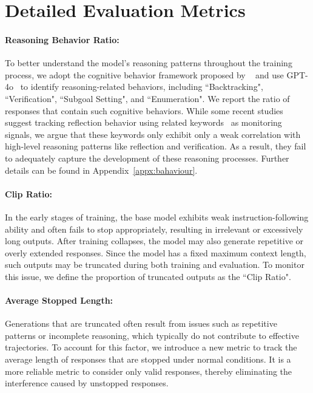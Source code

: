 \section{Detailed Evaluation Metrics}
\label{appx:eval_detail}
\paragraph{Reasoning Behavior Ratio:} To better understand the model's reasoning patterns throughout the training process, we adopt the cognitive behavior framework proposed by ~\citet{gandhi2025cognitive} and use GPT-4o~\citep{hurst2024gpt} to identify reasoning-related behaviors, including ``Backtracking", ``Verification", ``Subgoal Setting", and ``Enumeration". 
We report the ratio of responses that contain such cognitive behaviors.
While some recent studies suggest tracking reflection behavior using related keywords~\citep{yeo2025demystifying,xie2025logic} as monitoring signals, we argue that these keywords only exhibit only a weak correlation with high-level reasoning patterns like reflection and verification. As a result, they fail to adequately capture the development of these reasoning processes.  Further details can be found in Appendix~\ref{appx:bahaviour}.

\paragraph{Clip Ratio:} In the early stages of training, the base model exhibits weak instruction-following ability and often fails to stop appropriately, resulting in irrelevant or excessively long outputs. After training collapses, the model may also generate repetitive or overly extended responses. Since the model has a fixed maximum context length, such outputs may be truncated during both training and evaluation. To monitor this issue, we define the proportion of truncated outputs as the ``Clip Ratio".

\paragraph{Average Stopped Length:} Generations that are truncated often result from issues such as repetitive patterns or incomplete reasoning, which typically do not contribute to effective trajectories. To account for this factor, we introduce a new metric to track the average length of responses that are stopped under normal conditions. It is a more reliable metric to consider only valid responses, thereby eliminating the interference caused by unstopped responses.
